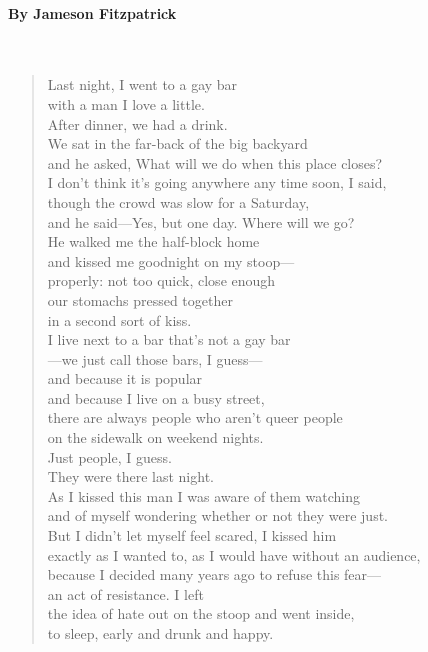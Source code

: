 \documentclass[12pt, openany, letterpaper]{memoir}
\begin{document}
\paragraph{By Jameson Fitzpatrick}~
\begin{verse}
	Last night, I went to a gay bar\\
	with a man I love a little.\\
	After dinner, we had a drink.\\
	We sat in the far-back of the big backyard\\
	and he asked, What will we do when this place closes?\\
	I don't think it's going anywhere any time soon, I said,\\
	though the crowd was slow for a Saturday,\\
	and he said—Yes, but one day. Where will we go?\\
	He walked me the half-block home\\
	and kissed me goodnight on my stoop—\\
	properly: not too quick, close enough\\
	our stomachs pressed together\\
	in a second sort of kiss.\\
	I live next to a bar that's not a gay bar\\
	—we just call those bars, I guess—\\
	and because it is popular\\
	and because I live on a busy street,\\
	there are always people who aren't queer people\\
	on the sidewalk on weekend nights.\\
	Just people, I guess.\\
	They were there last night.\\
	As I kissed this man I was aware of them watching\\
	and of myself wondering whether or not they were just.\\
	But I didn't let myself feel scared, I kissed him\\
	exactly as I wanted to, as I would have without an audience,\\
	because I decided many years ago to refuse this fear—\\
	an act of resistance. I left\\
	the idea of hate out on the stoop and went inside,\\
	to sleep, early and drunk and happy.\\

\end{verse}
\end{document}

